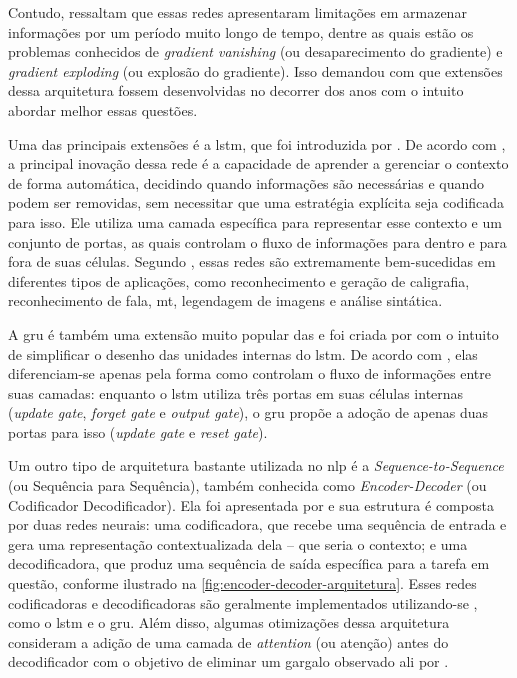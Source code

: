 Contudo,  ressaltam que essas redes apresentaram limitações em armazenar informações por um período muito longo de tempo, dentre as quais estão os problemas conhecidos de \textit{gradient vanishing} (ou desaparecimento do gradiente) e \textit{gradient exploding} (ou explosão do gradiente). Isso demandou com que extensões dessa arquitetura fossem desenvolvidas no decorrer dos anos com o intuito abordar melhor essas questões.

Uma das principais extensões é a \acrshort{lstm}, que foi introduzida por . De acordo com , a principal inovação dessa rede é a capacidade de aprender a gerenciar o contexto de forma automática, decidindo quando informações são necessárias e quando podem ser removidas, sem necessitar que uma estratégia explícita seja codificada para isso. Ele utiliza uma camada específica para representar esse contexto e um conjunto de portas, as quais controlam o fluxo de informações para dentro e para fora de suas células.
Segundo , essas redes são extremamente bem-sucedidas em diferentes tipos de aplicações, como reconhecimento e geração de caligrafia, reconhecimento de fala, \acrfull{mt}, legendagem de imagens e análise sintática.


A \acrshort{gru} é também uma extensão muito popular das  e foi criada por  com o intuito de simplificar o desenho das unidades internas do \acrshort{lstm}. 
De acordo com , elas diferenciam-se apenas pela forma como controlam o fluxo de informações entre suas camadas: enquanto o \acrshort{lstm} utiliza três portas em suas células internas (\textit{update gate}, \textit{forget gate} e \textit{output gate}), o \acrshort{gru} propõe a adoção de apenas duas portas para isso (\textit{update gate} e \textit{reset gate}).


Um outro tipo de arquitetura bastante utilizada no \acrshort{nlp} é a \textit{Sequence-to-Sequence} (ou Sequência para Sequência), também conhecida como \textit{Encoder-Decoder} (ou Codificador Decodificador). Ela foi apresentada por  e sua estrutura é composta por duas redes neurais: uma codificadora, que recebe uma sequência de entrada e gera uma representação contextualizada dela -- que seria o contexto; e uma decodificadora, que produz uma sequência de saída específica para a tarefa em questão, conforme ilustrado na \autoref{fig:encoder-decoder-arquitetura}. 
Esses redes codificadoras e decodificadoras são geralmente implementados utilizando-se , como o \acrshort{lstm} e o \acrshort{gru}. Além disso, algumas otimizações dessa arquitetura consideram a adição de uma camada de \textit{attention} (ou atenção) antes do decodificador com o objetivo de eliminar um gargalo observado ali por .

